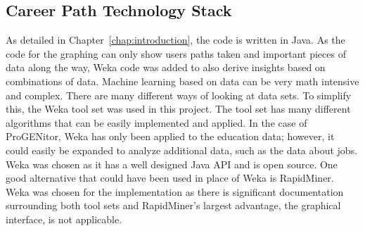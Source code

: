 \subsection{Career Path Technology Stack}
As detailed in Chapter~\ref{chap:introduction}, the code is written in Java.  As
the code for the graphing can only show users paths taken and important pieces of data along the
way, Weka code was added to also derive insights based on combinations of data. 
Machine learning based on data can be very math intensive and complex.  There
are many different ways of looking at data sets.  To simplify this, the Weka
tool set was used in this project.  The tool set has many different algorithms
that can be easily implemented and applied.  In the case of ProGENitor, Weka has
only been applied to the education data; however, it could easily be
expanded to analyze additional data, such as the data about jobs.  Weka was
chosen as it has a well designed Java API and is open source.  One good
alternative that could have been used in place of Weka is RapidMiner.  Weka was
chosen for the implementation as there is significant documentation surrounding
both tool sets and RapidMiner's largest advantage, the graphical interface, is
not applicable.
